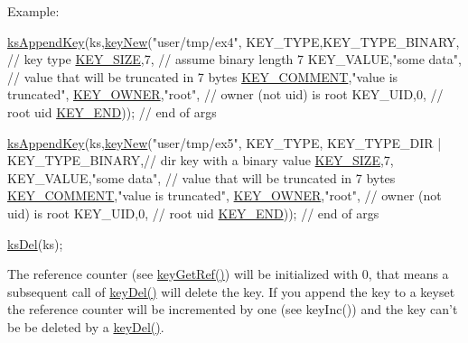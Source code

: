 \begin{DoxyParagraph}{Example\-:}
\begin{DoxyCode}
\hyperlink{group__keyset_gaa5a1d467a4d71041edce68ea7748ce45}{ksAppendKey}(ks,\hyperlink{group__key_gaf6893c038b3ebee90c73a9ea8356bebf}{keyNew}(\textcolor{stringliteral}{"user/tmp/ex4"},
        KEY\_TYPE,KEY\_TYPE\_BINARY,       \textcolor{comment}{// key type}
        \hyperlink{group__key_gga91fb3178848bd682000958089abbaf40a6d531b5c41445d19d0452eebdccbfa01}{KEY\_SIZE},7,                     \textcolor{comment}{// assume binary length 7}
        KEY\_VALUE,\textcolor{stringliteral}{"some data"},          \textcolor{comment}{// value that will be truncated in 7
       bytes}
        \hyperlink{group__key_gga91fb3178848bd682000958089abbaf40ac29427bb47cc31689d02912e36161ee3}{KEY\_COMMENT},\textcolor{stringliteral}{"value is truncated"},
        \hyperlink{group__key_gga91fb3178848bd682000958089abbaf40a77ca60362fa8daca8d5347db4385068b}{KEY\_OWNER},\textcolor{stringliteral}{"root"},               \textcolor{comment}{// owner (not uid) is root}
        KEY\_UID,0,                      \textcolor{comment}{// root uid}
        \hyperlink{group__key_gga91fb3178848bd682000958089abbaf40aa8adb6fcb92dec58fb19410eacfdd403}{KEY\_END}));                      \textcolor{comment}{// end of args}

\hyperlink{group__keyset_gaa5a1d467a4d71041edce68ea7748ce45}{ksAppendKey}(ks,\hyperlink{group__key_gaf6893c038b3ebee90c73a9ea8356bebf}{keyNew}(\textcolor{stringliteral}{"user/tmp/ex5"},
        KEY\_TYPE,
                KEY\_TYPE\_DIR | KEY\_TYPE\_BINARY,\textcolor{comment}{// dir key with a binary value}
        \hyperlink{group__key_gga91fb3178848bd682000958089abbaf40a6d531b5c41445d19d0452eebdccbfa01}{KEY\_SIZE},7,
        KEY\_VALUE,\textcolor{stringliteral}{"some data"},          \textcolor{comment}{// value that will be truncated in 7
       bytes}
        \hyperlink{group__key_gga91fb3178848bd682000958089abbaf40ac29427bb47cc31689d02912e36161ee3}{KEY\_COMMENT},\textcolor{stringliteral}{"value is truncated"},
        \hyperlink{group__key_gga91fb3178848bd682000958089abbaf40a77ca60362fa8daca8d5347db4385068b}{KEY\_OWNER},\textcolor{stringliteral}{"root"},               \textcolor{comment}{// owner (not uid) is root}
        KEY\_UID,0,                      \textcolor{comment}{// root uid}
        \hyperlink{group__key_gga91fb3178848bd682000958089abbaf40aa8adb6fcb92dec58fb19410eacfdd403}{KEY\_END}));                      \textcolor{comment}{// end of args}

\hyperlink{group__keyset_ga27e5c16473b02a422238c8d970db7ac8}{ksDel}(ks);
\end{DoxyCode}

\end{DoxyParagraph}
The reference counter (see \hyperlink{group__key_ga4aabc4272506dd63161db2bbb42de8ae}{key\-Get\-Ref()}) will be initialized with 0, that means a subsequent call of \hyperlink{group__key_ga3df95bbc2494e3e6703ece5639be5bb1}{key\-Del()} will delete the key. If you append the key to a keyset the reference counter will be incremented by one (see key\-Inc()) and the key can't be be deleted by a \hyperlink{group__key_ga3df95bbc2494e3e6703ece5639be5bb1}{key\-Del()}.


